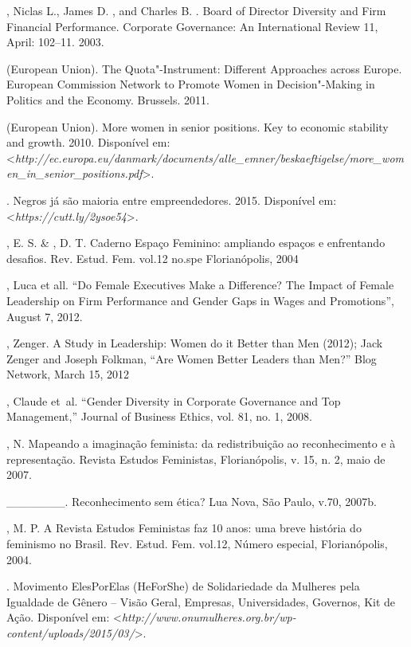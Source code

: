 \begin{Parskip}
, Niclas L., James D. , and Charles B. . Board of
Director Diversity and Firm Financial Performance. Corporate Governance:
An International Review 11, April: 102--11. 2003.

 (European Union). The Quota"-Instrument: Different Approaches across
Europe. European Commission Network to Promote Women in Decision"-Making
in Politics and the Economy. Brussels. 2011.

 (European Union). More women in senior positions. Key to economic
stability and growth. 2010.
Disponível em: \textless{}\emph{http://ec.europa.eu/danmark/documents/alle\_emner/beskaeftigelse/more\_women\_in\_senior\_positions.pdf}\textgreater{}.

. Negros já são maioria entre empreendedores. 2015.
Disponível em: \textless{}\emph{https://cutt.ly/2ysoe54}\textgreater{}.

, E. S. \& , D. T. Caderno Espaço Feminino: ampliando
espaços e enfrentando desafios. Rev. Estud. Fem. vol.12 no.spe
Florianópolis, 2004

, Luca et all. ``Do Female Executives Make a Difference? The
Impact of Female Leadership on Firm Performance and Gender Gaps in Wages
and Promotions'', August 7, 2012.

, Zenger. A Study in Leadership: Women do it Better than Men
(2012); Jack Zenger and Joseph Folkman, ``Are Women Better Leaders than
Men?''  Blog Network, March 15, 2012

, Claude et~al. ``Gender Diversity in Corporate Governance and
Top Management,'' Journal of Business Ethics, vol. 81, no. 1, 2008.

, N. Mapeando a imaginação feminista: da redistribuição ao
reconhecimento e à representação. Revista Estudos Feministas,
Florianópolis, v. 15, n. 2, maio de 2007.

\_\_\_\_\_\_\_. Reconhecimento sem ética? Lua Nova, São Paulo, v.70,
2007b.

, M. P. A Revista Estudos Feministas faz 10 anos: uma breve
história do feminismo no Brasil. Rev. Estud. Fem. vol.12, Número
especial, Florianópolis, 2004.

. Movimento ElesPorElas (HeForShe) de Solidariedade da 
Mulheres pela Igualdade de Gênero -- Visão Geral, Empresas,
Universidades, Governos, Kit de Ação.
Disponível em: \textless{}\emph{http://www.onumulheres.org.br/wp-content/uploads/2015/03/}\textgreater{}.


\end{Parskip}
